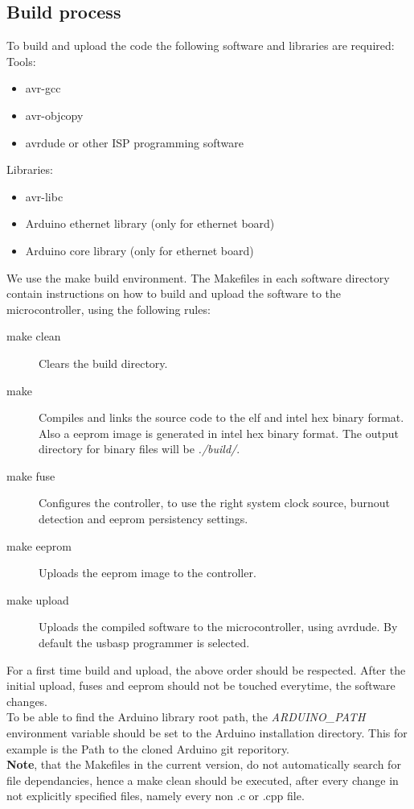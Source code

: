 \documentclass[a4paper]{scrreprt}
\begin{document}
\subsection{Build process}
To build and upload the code the following software and libraries are required:\\
Tools:
\begin{itemize}
  \item avr-gcc
  \item avr-objcopy
  \item avrdude or other ISP programming software
\end{itemize}
Libraries:
\begin{itemize}
  \item avr-libc
  \item Arduino ethernet library (only for ethernet board)
  \item Arduino core library (only for ethernet board)
\end{itemize}
We use the make build environment. The Makefiles in each software directory contain instructions on how to build and upload the software to the microcontroller, using the following rules:
\begin{description}
  \item[make clean] Clears the build directory.
  \item[make] Compiles and links the source code to the elf and intel hex binary format. Also a eeprom image is generated in intel hex binary format. The output directory for binary files will be \emph{./build/}.
  \item[make fuse] Configures the controller, to use the right system clock source, burnout detection and eeprom persistency settings.
  \item[make eeprom] Uploads the eeprom image to the controller.
  \item[make upload] Uploads the compiled software to the microcontroller, using avrdude. By default the usbasp programmer is selected.
\end{description}
For a first time build and upload, the above order should be respected. After the initial upload, fuses and eeprom should not be touched everytime, the software changes.\\
To be able to find the Arduino library root path, the \emph{ARDUINO\_PATH} environment variable should be set to the Arduino installation directory. This for example is the Path to the cloned Arduino git reporitory.\\
\textbf{Note}, that the Makefiles in the current version, do not automatically search for file dependancies, hence a make clean should be executed, after every change in not explicitly specified files, namely every non .c or .cpp file.
\end{document}
